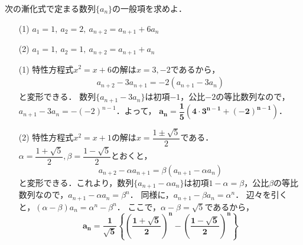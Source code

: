 \documentclass[a4paper,11pt]{ltjsarticle}
\begin{document}
    \newpage
   \begin{toi}
次の漸化式で定まる数列$\{a_n\}$の一般項を求めよ．\\
\begin{minipage}{0.5\linewidth}
\begin{itemize}
    \item [(1)]    $a_1=1,~a_2=2,~a_{n+2}=a_{n+1}+6a_n$
\end{itemize}
\end{minipage}
\begin{minipage}{0.5\linewidth}
\begin{itemize}
    \item [(2)]$a_1=1,~a_2=1,~a_{n+2}=a_{n+1}+a_n$
\end{itemize}
\end{minipage}
\end{toi}
\ans 
\begin{itemize}
\item[(1)] 特性方程式$x^2=x+6$の解は$x=3,-2$であるから，
\begin{align*}
    a_{n+2}-3a_{n+1}=-2(a_{n+1}-3a_n) \end{align*}
と変形できる．
数列$\{a_{n+1}-3a_n\}$は初項$-1$，公比$-2$の等比数列なので，\\
$a_{n+1}-3a_n=-(-2)^{n-1}$．よって， $\boldsymbol{a_n=\dfrac15\left(4\cdot3^{n-1}+(-2)^{n-1}\right)}$．

\item[(2)] 特性方程式$x^2=x+1$の解は$x=\dfrac{1\pm\sqrt5}{2}$である．
$\alpha=\dfrac{1+\sqrt5}{2}, \beta=\dfrac{1-\sqrt5}{2}$とおくと，
\[a_{n+2}-\alpha a_{n+1}=\beta(a_{n+1}-\alpha a_n)\]
と変形できる．これより，数列$\{a_{n+1}-\alpha a_n\}$は初項$1-\alpha=\beta$，公比$\beta$の等比数列なので，$a_{n+1}-\alpha a_n=\beta^n$．
同様に，$a_{n+1}-\beta a_n=\alpha^n$．
辺々を引くと，$(\alpha-\beta)a_n=\alpha^n-\beta^n$．
ここで，$\alpha-\beta=\sqrt5$であるから，
\[\boldsymbol{a_n=\frac{1}{\sqrt5}\left\{\left(\frac{1+\sqrt5}{2}\right)^n-\left(\frac{1-\sqrt5}{2}\right)^n\right\}}\]
\end{itemize}
\end{document}
